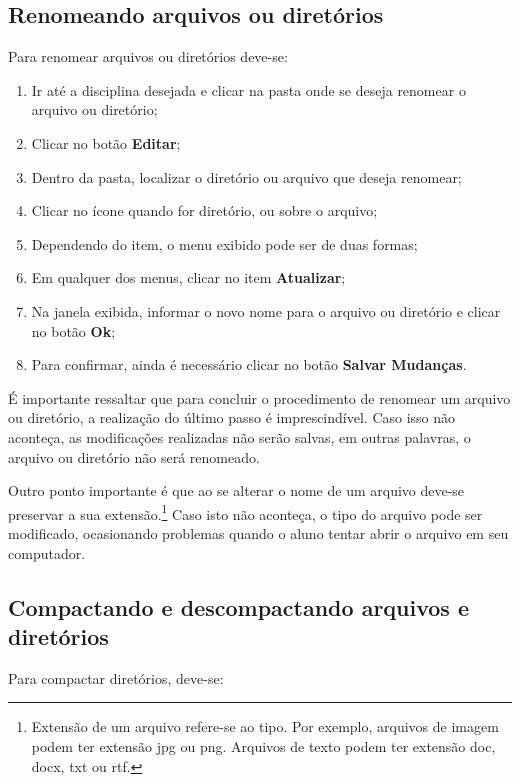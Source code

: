 \subsection{Renomeando arquivos ou diretórios}
Para renomear arquivos ou diretórios deve-se:
\begin{enumerate}
\item Ir até a disciplina desejada e clicar na pasta onde se deseja renomear o arquivo ou diretório;
\item Clicar no botão \textbf{Editar};
\item Dentro da pasta, localizar o diretório ou arquivo que deseja renomear;
\item Clicar no ícone quando for diretório, ou sobre o arquivo;
\item Dependendo do item, o menu exibido pode ser de duas formas;
\item Em qualquer dos menus, clicar no item \textbf{Atualizar};
\item Na janela exibida, informar o novo nome para o arquivo ou diretório e clicar no botão \textbf{Ok};
\item Para confirmar, ainda é necessário clicar no botão \textbf{Salvar Mudanças}.
\end{enumerate} 
É importante ressaltar que para concluir o procedimento de renomear um arquivo ou diretório, a realização do último passo é imprescindível. Caso isso não aconteça, as modificações realizadas não serão salvas, em outras palavras, o arquivo ou diretório não será renomeado.

Outro ponto importante é que ao se alterar o nome de um arquivo deve-se preservar a sua extensão.\footnote{Extensão de um arquivo refere-se ao tipo. Por exemplo, arquivos de imagem podem ter extensão jpg ou png. Arquivos de texto podem ter extensão doc, docx, txt ou rtf.} Caso isto não aconteça, o tipo do arquivo pode ser modificado, ocasionando problemas quando o aluno tentar abrir o arquivo em seu computador.


\subsection{Compactando e descompactando arquivos e diretórios}
Para compactar diretórios, deve-se:

